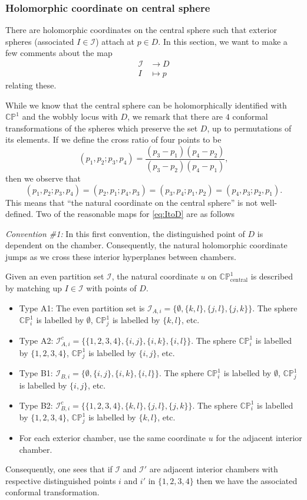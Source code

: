 \documentclass[12pt,letterpaper,reqno]{amsart}
\theoremstyle{remark}
\theoremstyle{definition}
\numberwithin{thm}{section}
\numberwithin{equation}{section}
\numberwithin{figure}{section}
\newcommand{\cI}{\ensuremath{\mathcal I}}
\newcommand{\CP}{\ensuremath{\mathbb {CP}}}
\begin{document}
\subsubsection{Holomorphic coordinate on central sphere}
There are holomorphic coordinates on the central sphere such that exterior spheres (associated $I \in \mathcal{I}$) attach at $p \in D$. In this section, we want to make a few comments about the map
\begin{align}\label{eq:ItoD} \mathcal{I} &\to D \\ \nonumber 
I &\mapsto p \end{align}
relating these. 


While we know that the central sphere can be holomorphically identified with $\CP^1$ and the wobbly locus with $D$, we remark that there are $4$ conformal transformations of the spheres which preserve the set $D$, up to permutations of its elements.  If we define the cross ratio of four points to be 
\[(p_1, p_2;p_3, p_4) = \frac{(p_3-p_1)(p_4-p_2)}{(p_3-p_2)(p_4-p_1)},\]
then we observe that 
\[(p_1, p_2;p_3, p_4)=(p_2, p_1; p_4, p_3)=(p_3, p_4; p_1, p_2)=(p_4, p_3; p_2, p_1). \]
This means that ``the natural coordinate on the central sphere'' is not well-defined. Two of the reasonable maps for \eqref{eq:ItoD} are as follows

\medskip
\noindent\emph{Convention \#1:} In this first convention, the distinguished point of $D$ is dependent on the chamber.  Consequently, the natural holomorphic coordinate jumps as we cross these interior hyperplanes between chambers.

Given an even partition set $\cI$, the natural coordinate $u$ on $\CP^1_{\mathrm{central}}$ is described by matching up $I \in \cI$ with points of $D$.
\begin{itemize}
  \item Type A1: The even partition set is $\mathcal{I}_{A, i}=\{\emptyset, \{k,l\}, \{j,l\}, \{j,k\}\}$. The sphere $\CP^1_i$ is labelled by $\emptyset$, $\CP^1_j$ is labelled by $\{k,l\}$, etc.
  \item Type A2: $\mathcal{I}_{A, i}^c=\{\{1, 2, 3, 4\}, \{i,j\}, \{i,k\}, \{i,l\}\}$. The sphere $\CP^1_i$ is labelled by $\{1, 2, 3, 4\}$, $\CP^1_j$ is labelled by $\{i,j\}$, etc.
  \item Type B1: $\mathcal{I}_{B, i}=\{\emptyset, \{i,j\}, \{i,k\}, \{i,l\}\}$. The sphere $\CP^1_i$ is labelled by $\emptyset$, $\CP^1_j$ is labelled by $\{i,j\}$, etc.
  \item  Type B2: $\mathcal{I}_{B, i}^c=\{ \{1, 2, 3, 4\}, \{k,l\}, \{j,l\}, \{j,k\} \}$. The sphere $\CP^1_i$ is labelled by $\{1, 2, 3, 4\}$, $\CP^1_j$ is labelled by $\{k,l\}$, etc.
  \item For each exterior chamber, use the same coordinate $u$ for the adjacent interior chamber.
  \end{itemize}
Consequently, one sees that if $\mathcal{I}$ and $\mathcal{I}'$ are adjacent interior chambers with respective distinguished points $i$ and $i'$ in $\{1, 2, 3, 4\}$ then we have the associated conformal transformation. 
\end{document}
